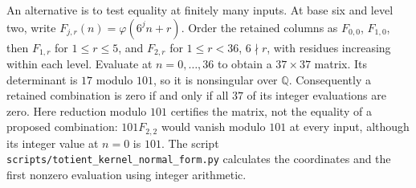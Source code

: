 \documentclass[11pt]{article}
\theoremstyle{plain}
\theoremstyle{definition}
\theoremstyle{remark}
\newcommand{\Q}{\mathbb{Q}}
\begin{document}
An alternative is to test equality at finitely many inputs. At base six
and level two, write $F_{j,r}(n)=\varphi(6^jn+r)$. Order the retained
columns as $F_{0,0}$, $F_{1,0}$, then $F_{1,r}$ for $1\le r\le5$,
and $F_{2,r}$ for $1\le r<36$, $6\nmid r$, with residues increasing
within each level. Evaluate at
$n=0,\ldots,36$ to obtain a $37\times37$ matrix.
Its determinant is $17$ modulo $101$, so it is nonsingular over $\Q$.
Consequently a retained combination is zero if and only if all $37$
of its integer evaluations are zero. Here reduction modulo $101$
certifies the matrix, not the equality of a proposed combination:
$101F_{2,2}$ would vanish modulo $101$ at every input, although its
integer value at $n=0$ is $101$.
The script \texttt{scripts/totient\_kernel\_normal\_form.py} calculates
the coordinates and the first nonzero evaluation using integer arithmetic.
\end{document}
